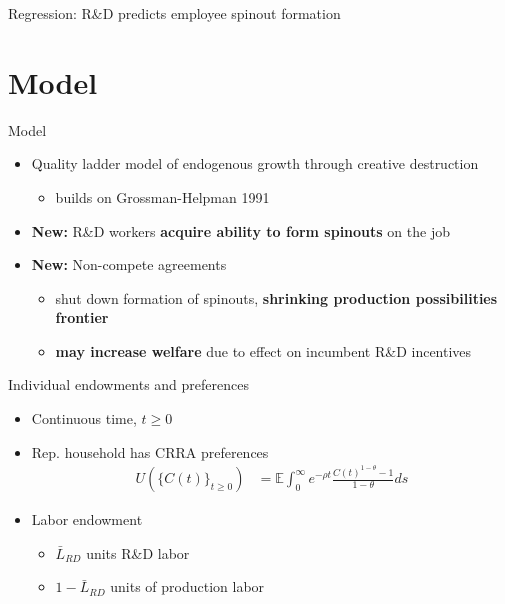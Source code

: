 \documentclass[english,usenames,dvipsnames]{beamer}
\begin{document}
\begin{frame}{Regression: R\&D predicts employee spinout formation}
	\begin{table}
		\tiny
		\centering
		
		\caption{\scriptsize The dependent variable is average yearly number of founders joining WSOs in years $t+1,t+2,t+3$. The independent variables are averages over $t,t-1,t-2$. Firm controls include are employment, assets, intangible assets, investment, net income, cumulative citation-weighted patents, and Tobin's Q.}
	\end{table}
\end{frame}


\section{Model}

\begin{frame}
	\tableofcontents[currentsection]
\end{frame}

\begin{frame}{Model}
	\begin{itemize}	
		\item Quality ladder model of endogenous growth through creative destruction 
		\begin{itemize}
			\item builds on Grossman-Helpman 1991
		\end{itemize}
		\medskip
		\item \alert{\textbf{New:}} R\&D workers \textbf{\alert{acquire ability to form spinouts}} on the job
		\medskip
		\item \alert{\textbf{New:}} Non-compete agreements
		\begin{itemize}
			\item shut down formation of spinouts, \textbf{\alert{shrinking production possibilities frontier}}
			\item \textbf{\alert{may increase welfare}} due to effect on incumbent R\&D incentives
		\end{itemize}
	\end{itemize}
\end{frame}

\begin{frame}{Individual endowments and preferences}
	\begin{itemize}
		\item Continuous time, $t \ge 0$
		\item Rep. household has CRRA preferences 
		\begin{align*}
		U(\{C(t)\}_{t \ge 0}) &= \mathbb{E} \int_0^{\infty} e^{-\rho t} \frac{C(t)^{1-\theta} - 1}{1 - \theta} ds
		\end{align*}
		\item Labor endowment
		\begin{itemize}
			\item $\bar{L}_{RD}$ units R\&D labor
			\item $1 - \bar{L}_{RD}$ units of production labor
		\end{itemize}
	\end{itemize}
\end{frame}
\end{document}

